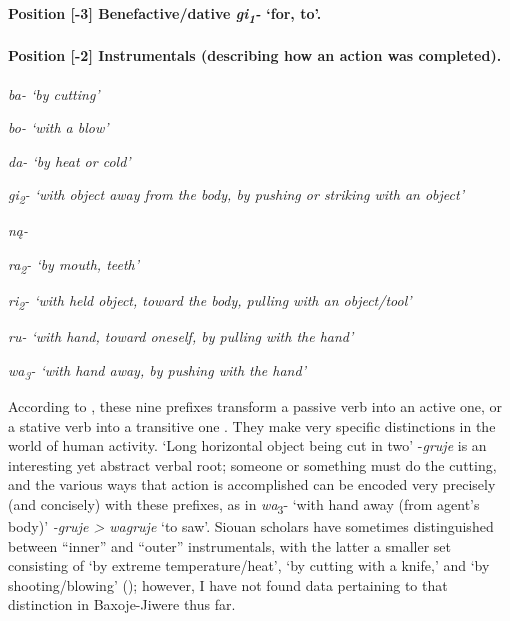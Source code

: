 \documentclass[output=paper]{LSP/langsci}
\begin{document}
\paragraph*{Position [-3]  Benefactive/dative \textit{gi\textsubscript{1}-} `for, to'.}   
\noindent
\paragraph*{Position [-2]  Instrumentals (describing how an action was completed).}

\ea
\ea  \itshape  ba-  {\upshape `by cutting' }
			
\ex   \itshape bo-  {\upshape `with a blow'      	}

\ex   \itshape da-  {\upshape `by heat or cold' 	}

\ex   \itshape gi\textsubscript{2}-  {\upshape `with object away from the body, by pushing or striking with an object' 			}

\ex   \itshape n\k{a}-  {}

\ex   \itshape ra\textsubscript{2}-  {{\upshape `by mouth, teeth'				}}

\ex   \itshape ri\textsubscript{2}-   {{\upshape `with held object, toward the body, pulling with an object/tool'    		}}

\ex   \itshape ru-  {{\upshape `with hand, toward oneself, by pulling with the hand' 			}}

\ex   \itshape wa\textsubscript{3}-  {{\upshape `with hand away, by pushing with the hand'}}
\z
\z

According to \citet[246]{Whitman1947}, these nine prefixes transform a passive verb into an active one, or a stative verb into a transitive one \citep[483]{Rankin2005b}. They make very specific distinctions in the world of human activity. `Long horizontal object being cut in two' -\textit{gruje} is an interesting yet abstract verbal root; someone or something must do the cutting, and the various ways that action is accomplished can be encoded very precisely (and concisely) with these prefixes, as in \textit{wa}\textsubscript{3}- `with hand away (from agent's body)' \textit{-gruje > wagruje} `to saw'.  Siouan scholars have sometimes distinguished between ``inner'' and ``outer'' instrumentals, with the latter a smaller set consisting of `by extreme temperature/heat', `by cutting with a knife,' and `by shooting/blowing' (\citealt[483-485]{Rankin2005b}); however, I have not found data pertaining to that distinction in Baxoje-Jiwere thus far.   		
     
\end{document}
